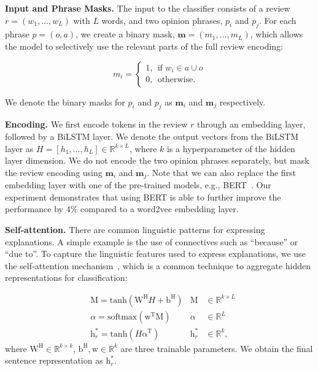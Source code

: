 \smallskip
\noindent \textbf{Input and Phrase Masks.} 
The input to the classifier consists of a review $r = (w_1, ..., w_L)$ with $L$ words, and two opinion phrases, $p_i$ and $p_j$. 
For each phrase $p=(o, a)$, we create a binary mask, \mbox{$\mathbf{m} = (m_1, ..., m_L)$}, 
which allows the model to selectively use the relevant parts of the full review encoding:

\vspace{-2mm}
\begin{equation*}
m_i = 
\begin{cases}
    1, ~~\text{if~} w_i \in a\cup o \\
    0, ~~\text{otherwise}.
\end{cases}
\end{equation*}
\vspace{-2mm}

\noindent We denote the binary masks for $p_i$ and $p_j$ as $\mathbf{m}_i$ and $\mathbf{m}_j$ respectively.

\smallskip
\noindent \textbf{Encoding.} We first encode tokens in the review $r$ through  
an embedding layer, followed by a BiLSTM layer. We denote the output vectors from the BiLSTM layer as $H=[h_1, ..., h_L] \in \mathbb{R}^{k\times L}$, where $k$ is a hyperparameter of the hidden layer dimension. We do not encode the two opinion phrases separately, but mask the review encoding using $\mathbf{m}_i$ and $\mathbf{m}_j$. Note that we can also replace the first embedding layer with one of the pre-trained models, e.g., BERT~\cite{devlin2018bert}. Our experiment demonstrates that using BERT is able to further improve the performance by $4\%$ compared to a word2vec embedding layer.


\smallskip
\noindent \textbf{Self-attention.} 
There are common linguistic patterns for expressing explanations. A simple example is the use of connectives such as ``because'' or ``due to''.  
To capture the linguistic features used to express explanations, we use the self-attention mechanism~\cite{bahdanau2014neural}, which is a common technique to aggregate hidden representations for classification:

\vspace{-1mm}
\begin{align}
    &\mathrm{M} = \text{tanh}(\mathrm{W}^\mathrm{H} H + \mathrm{b}^\mathrm{H})  &\mathrm{M} &\in \mathbb{R}^{k\times L}\\
    &\alpha = \text{softmax}(\mathrm{w}^\mathrm{T} \mathrm{M}) &\alpha & \in \mathbb{R}^{L}\\
    &\mathrm{h}_r^* = \text{tanh} (H \mathrm{\alpha}^\mathrm{T}) & \mathrm{h}_r^*& \in \mathbb{R}^{k},
\end{align}
where $\mathrm{W}^\mathrm{H}\in \mathbb{R}^{k\times k}$,  $\mathrm{b}^\mathrm{H}, \mathrm{w} \in  \mathbb{R}^{k}$ are three trainable parameters. We obtain the final sentence representation as $\mathrm{h}_r^*$.


